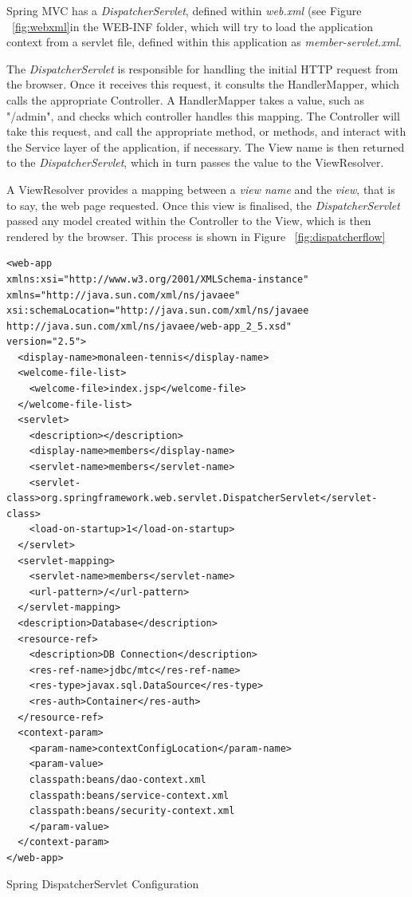Spring MVC has a \textit{DispatcherServlet}, defined within \textit{web.xml} (see Figure ~\ref{fig:webxml}in the WEB-INF folder, which will try to load the application context from a servlet file, defined within this application as \textit{member-servlet.xml}. 

The \textit{DispatcherServlet} is responsible for handling the initial HTTP request from the browser. Once it receives this request, it consults the HandlerMapper, which calls the appropriate Controller. A HandlerMapper takes a value, such as "/admin", and checks which controller handles this mapping. The Controller will take this request, and call the appropriate method, or methods, and interact with the Service layer of the application, if necessary. The View name is then returned to the \textit{DispatcherServlet}, which in turn passes the value to the ViewResolver. 

A ViewResolver provides a mapping between a \textit{view name} and the \textit{view}, that is to say, the web page requested. Once this view is finalised, the \textit{DispatcherServlet} passed any model created within the Controller to the View, which is then rendered by the browser. This process is shown in Figure ~\ref{fig:dispatcherflow}


\begin{lstlisting}
<web-app 
xmlns:xsi="http://www.w3.org/2001/XMLSchema-instance" 
xmlns="http://java.sun.com/xml/ns/javaee" 
xsi:schemaLocation="http://java.sun.com/xml/ns/javaee http://java.sun.com/xml/ns/javaee/web-app_2_5.xsd" 
version="2.5">
  <display-name>monaleen-tennis</display-name>
  <welcome-file-list>
    <welcome-file>index.jsp</welcome-file>
  </welcome-file-list>
  <servlet>
    <description></description>
    <display-name>members</display-name>
    <servlet-name>members</servlet-name>
    <servlet-class>org.springframework.web.servlet.DispatcherServlet</servlet-class>
    <load-on-startup>1</load-on-startup>
  </servlet>
  <servlet-mapping>
    <servlet-name>members</servlet-name>
    <url-pattern>/</url-pattern>
  </servlet-mapping>
  <description>Database</description>
  <resource-ref>
    <description>DB Connection</description>
    <res-ref-name>jdbc/mtc</res-ref-name>
    <res-type>javax.sql.DataSource</res-type>
    <res-auth>Container</res-auth>
  </resource-ref>
  <context-param>
    <param-name>contextConfigLocation</param-name>
    <param-value>
	classpath:beans/dao-context.xml
	classpath:beans/service-context.xml
	classpath:beans/security-context.xml
	</param-value>
  </context-param>
</web-app>
\end{lstlisting}
\begin{table}[H]
\caption{Spring DispatcherServlet Configuration}
\label{fig:webxml}
\end{table}

